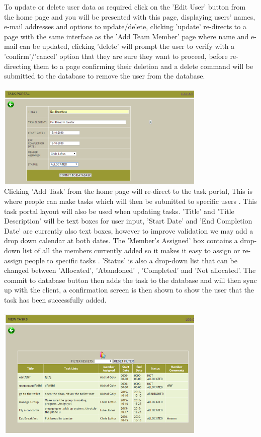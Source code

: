\documentclass{project}
\begin{document}
To update or delete user data as required \cite{se.qa.rs fr3} click on the 'Edit User' button from the home page and you will be presented with this page, displaying users' names, e-mail addresses and options to update/delete, clicking 'update' re-directs to a page with the same interface as the 'Add Team Member' page where name and e-mail can be updated, clicking 'delete' will prompt the user to verify with a 'confirm'/'cancel' option that they are sure they want to proceed, before re-directing them to a page confirming their deletion and a delete command will be submitted to the database to remove the user from the database. \\~\\
\newline
\includegraphics[width=0.75\textwidth, center]{images/5.2/TaskerMANAddTask} \\
Clicking 'Add Task' from the home page will re-direct to the task portal, This is where people can make tasks which will then be submitted to specific users \cite{se.qa.rs fr4}. This task portal layout will also be used when updating tasks. 'Title' and 'Title Description' will be text boxes for user input, 'Start Date' and 'End Completion Date' are currently also text boxes, however to improve validation we may add a drop down calendar at both dates. The 'Member's Assigned' box contains a drop-down list of all the members currently added so it makes it easy to assign or re-assign people to specific tasks \cite{se.qa.rs fr5}. 'Status' is also a drop-down list that can be changed between 'Allocated', 'Abandoned' \cite{se.qa.rs fr6}, 'Completed' and 'Not allocated'. The commit to database button then adds the task to the database and will then sync up with the client, a confirmation screen is then shown to show the user that the task has been successfully added. \\~\\
\newline
\includegraphics[width=0.75\textwidth, center]{images/5.2/TaskerMANViewTask} \\
\end{document}
